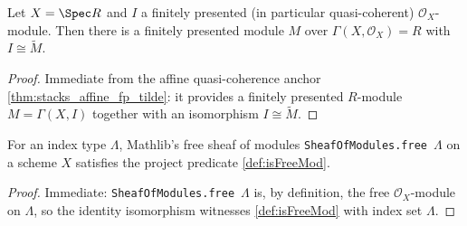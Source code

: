 \begin{lemma}
  \label{lem:fp_sheaf_affine_tilde}
  Let $X = \Spec R$ and $I$ a finitely presented (in particular quasi-coherent)
  $\mathcal{O}_X$-module. Then there is a finitely presented module $M$ over
  $\Gamma(X, \mathcal{O}_X) = R$ with $I \cong \widetilde M$.
  \begin{proof}
    Immediate from the affine quasi-coherence anchor
    \cref{thm:stacks_affine_fp_tilde}: it provides a finitely presented
    $R$-module $M = \Gamma(X, I)$ together with an isomorphism
    $I \cong \widetilde M$.
  \end{proof}
\end{lemma}


\begin{lemma}

  \label{lem:free_isFreeMod}
  For an index type $\Lambda$, Mathlib's free sheaf of modules
  \texttt{SheafOfModules.free}~$\Lambda$ on a scheme $X$ satisfies the project
  predicate \cref{def:isFreeMod}.
  \begin{proof}
    Immediate: \texttt{SheafOfModules.free}~$\Lambda$ is, by definition, the free
    $\mathcal{O}_X$-module on $\Lambda$, so the identity isomorphism witnesses
    \cref{def:isFreeMod} with index set $\Lambda$.
  \end{proof}
\end{lemma}


